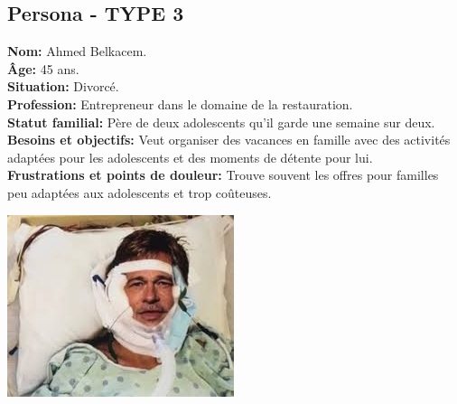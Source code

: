 \documentclass[a4paper,11pt]{article}
\begin{document}
\subsection{Persona - TYPE 3}
\begin{minipage}{0.6\textwidth} %
\textbf{Nom:} Ahmed Belkacem.\\
\textbf{Âge:} 45 ans.\\
\textbf{Situation:} Divorcé.\\
\textbf{Profession:} Entrepreneur dans le domaine de la restauration.\\
\textbf{Statut familial:} Père de deux adolescents qu'il garde une semaine sur deux.\\
\textbf{Besoins et objectifs:} Veut organiser des vacances en famille avec des activités adaptées pour les adolescents et des moments de détente pour lui.\\
\textbf{Frustrations et points de douleur:} Trouve souvent les offres pour familles peu adaptées aux adolescents et trop coûteuses.\\
\end{minipage}%
\hspace{1cm}
\begin{minipage}{0.3\textwidth} %
    \begin{center}
        \includegraphics[width=\textwidth]{images/Cbradpitt.jpeg} %
    \end{center}
\end{minipage}
\end{document}
